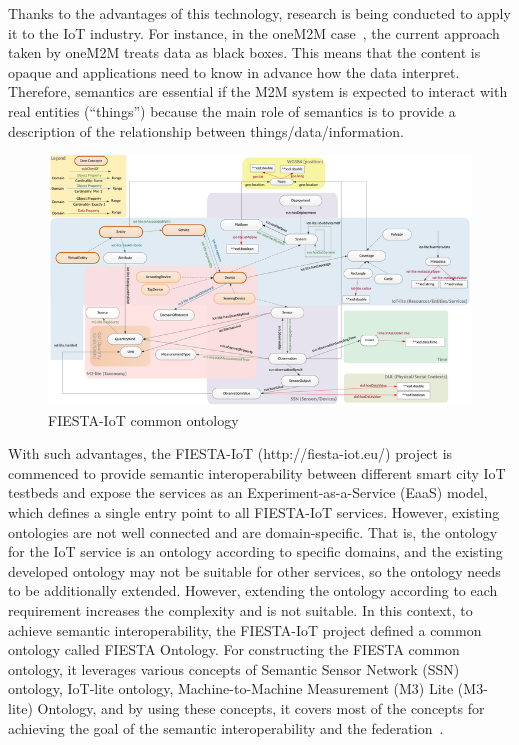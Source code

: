 Thanks to the advantages of this technology, research is being conducted to apply it to the IoT industry. For instance, in the oneM2M case~\cite{tr0007}, the current approach taken by oneM2M treats data as black boxes. This means that the content is opaque and applications need to know in advance how the data interpret. Therefore, semantics are essential if the M2M system is expected to interact with real entities (“things”) because the main role of semantics is to provide a description of the relationship between things/data/information. 

\begin{figure}[H]
	\centering
	\includegraphics[width=\textwidth]{figures/fig_fiesta-ontology.png}
    \caption{FIESTA-IoT common ontology}
    \label{fig:fiesta-common-ontology}
\end{figure}

With such advantages, the FIESTA-IoT (http://fiesta-iot.eu/) project is commenced to provide semantic interoperability between different smart city IoT testbeds and expose the services as an Experiment-as-a-Service (EaaS) model, which defines a single entry point to all FIESTA-IoT services. However, existing ontologies are not well connected and are domain-specific. That is, the ontology for the IoT service is an ontology according to specific domains, and the existing developed ontology may not be suitable for other services, so the ontology needs to be additionally extended. However, extending the ontology according to each requirement increases the complexity and is not suitable. In this context, to achieve semantic interoperability, the FIESTA-IoT project defined a common ontology called FIESTA Ontology. For constructing the FIESTA common ontology, it leverages various concepts of Semantic Sensor Network (SSN) ontology, IoT-lite ontology, Machine-to-Machine Measurement (M3) Lite (M3-lite) Ontology, and by using these concepts, it covers most of the concepts for achieving the goal of the semantic interoperability and the federation~\cite {agarwal2016unified}.

